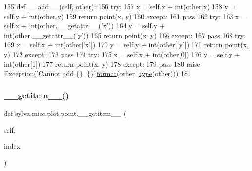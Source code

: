 \begin{DoxyCode}
155         \textcolor{keyword}{def }\_\_add\_\_(self, other):
156             \textcolor{keywordflow}{try}:
157                 x = self.x + int(other.x)
158                 y = self.y + int(other.y)
159                 \textcolor{keywordflow}{return} point(x, y)
160             \textcolor{keywordflow}{except}:
161                 \textcolor{keywordflow}{pass}
162             \textcolor{keywordflow}{try}:
163                 x = self.x + int(other.\_\_getattr\_\_(\textcolor{stringliteral}{'x'}))
164                 y = self.y + int(other.\_\_getattr\_\_(\textcolor{stringliteral}{'y'}))
165                 \textcolor{keywordflow}{return} point(x, y)
166             \textcolor{keywordflow}{except}:
167                 \textcolor{keywordflow}{pass}
168             \textcolor{keywordflow}{try}:
169                 x = self.x + int(other[\textcolor{stringliteral}{'x'}])
170                 y = self.y + int(other[\textcolor{stringliteral}{'y'}])
171                 \textcolor{keywordflow}{return} point(x, y)
172             \textcolor{keywordflow}{except}:
173                 \textcolor{keywordflow}{pass}
174             \textcolor{keywordflow}{try}:
175                 x = self.x + int(other[0])
176                 y = self.y + int(other[1])
177                 \textcolor{keywordflow}{return} point(x, y)
178             \textcolor{keywordflow}{except}:
179                 \textcolor{keywordflow}{pass}
180             \textcolor{keywordflow}{raise} Exception(\textcolor{stringliteral}{'Cannot add \{\}, \{\}'}.\hyperlink{namespacesylva_1_1examples_1_1hsdfg_ab3510a0b8457362330aa4d9fd2209590}{format}(other, \hyperlink{namespacesylva_1_1misc_1_1exec_a55d55e6d0e68715dfbd883034bd7290c}{type}(other)))
181 
\end{DoxyCode}
\mbox{\label{classsylva_1_1misc_1_1plot_1_1point_a38c8a33b3548844e6aa0be06d639dc5f}} 
\subsubsection{\texorpdfstring{\+\_\+\+\_\+getitem\+\_\+\+\_\+()}{\_\_getitem\_\_()}}
{\footnotesize\ttfamily def sylva.\+misc.\+plot.\+point.\+\_\+\+\_\+getitem\+\_\+\+\_\+ (\begin{DoxyParamCaption}\item[{}]{self,  }\item[{}]{index }\end{DoxyParamCaption})}



